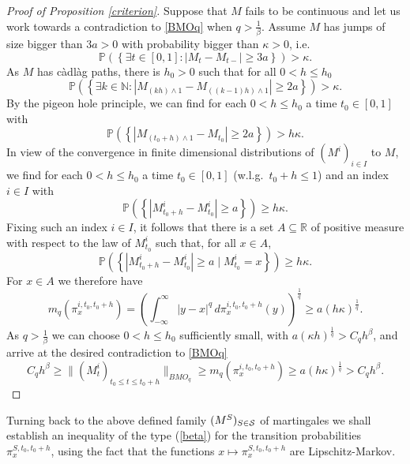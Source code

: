 \documentclass[11pt,a4paper]{article}%
\def\P{{\mathbb P}}
\def\R{{\mathbb R}}
\renewcommand{\subset}{\subseteq}
\numberwithin{equation}{section}
\begin{document}
\begin{proof}[Proof of Proposition \ref{criterion}]
Suppose that $M$ fails to be continuous and let us work towards a contradiction to \eqref{BMOq} when $q > \frac{1}{\beta}$.
Assume $M$ has jumps of size bigger than $3a > 0$ with probability bigger than $\kappa >0$, i.e.
\[
	\mathbb P\left( \left\{ \exists t \in [0,1] \colon |M_{t} - M_{t-}| \geq 3a \right\} \right) > \kappa.
\]
As $M$ has c\`adl\`ag paths, there is $h_0 > 0$ such that for all $0 < h \leq h_0$
\[
	\mathbb P\left( \left\{ \exists k \in \mathbb N \colon |M_{(kh)\wedge 1} - M_{((k-1)h)\wedge 1}| \ge 2a \right\} \right) > \kappa.
\]
By the pigeon hole principle, we can find for each $0 < h \leq h_0$ a time $t_0 \in [0,1]$ with
\begin{equation}\label{a}
	\P\left( \left\{ |M_{(t_0 +h)\wedge 1} - M_{t_0}| \ge 2a \right\}  \right) > h\kappa.
\end{equation}
In view of the convergence in finite dimensional distributions of $(M^i)_{i \in I}$ to $M$, we find for each $0 < h \leq h_0$ a time $t_0 \in [0,1]$ (w.l.g.\ $t_0 + h \leq 1$) and an index $i \in I$ with
\begin{equation}\label{a'}
	\P\left( \left\{ |M^i_{t_0 + h} - M^i_{t_0}| \ge a \right\} \right) \geq h \kappa.
\end{equation}
Fixing such an index $i \in I$, it follows that there is a set $A \subset \R$ of positive measure with respect to the law of $M^i_{t_0}$ such that, for all $x \in A$,
\begin{equation}\label{acond}
	\P\left( \left\{ |M^i_{t_0 +h} - M^i_{t_0}| \ge a \mid M^i_{t_0} = x \right\} \right) \geq h\kappa.
\end{equation}
For $x \in A$ we therefore have
\begin{equation}\label{mq}
	m_q(\pi_x^{i ,t_0 ,t_0 +h}) = \left(\int_{-\infty}^\infty |y-x|^q \, d\pi_x^{i,t_0 ,t_0 +h}(y)\right)^{\frac{1}{q}} \geq a(h\kappa )^{\frac{1}{q}}.
\end{equation}
As $q > \frac{1}{\beta}$ we can choose $0 < h \leq h_0$ sufficiently small, with $a (\kappa h)^{\frac{1}{q}} > C_q h^\beta$, and arrive at the desired contradiction to \eqref{BMOq}
\begin{equation*}
	C_q h^\beta \geq \lVert (M_t^i)_{t_0 \leq t \leq t_0 + h} \rVert_{BMO_q} \geq m_q(\pi_x^{i,t_0,t_0+h}) \geq a (h\kappa)^{\frac{1}{q}} > C_qh^\beta.
\end{equation*}
\end{proof}


Turning back to the above defined family $(M^S)_{S \in \cal S}$ of martingales we shall establish an inequality of the type (\ref{beta}) for the transition probabilities $\pi_x^{S ,t_0 ,t_0 +h}$, using the fact that the functions $x \mapsto \pi_x^{S,t_0,t_0+h} $ are Lipschitz-Markov.
\end{document}
